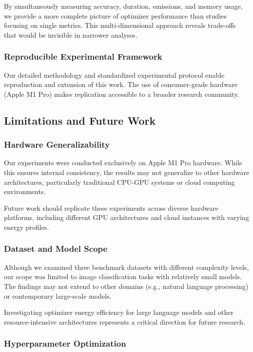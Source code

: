 \documentclass[conference]{IEEEtran}
\begin{document}
By simultaneously measuring accuracy, duration, emissions, and memory usage, we provide a more complete picture of optimizer performance than studies focusing on single metrics. This multi-dimensional approach reveals trade-offs that would be invisible in narrower analyses.

\subsubsection{Reproducible Experimental Framework}

Our detailed methodology and standardized experimental protocol enable reproduction and extension of this work. The use of consumer-grade hardware (Apple M1 Pro) makes replication accessible to a broader research community.

\subsection{Limitations and Future Work}

\subsubsection{Hardware Generalizability}

Our experiments were conducted exclusively on Apple M1 Pro hardware. While this ensures internal consistency, the results may not generalize to other hardware architectures, particularly traditional CPU-GPU systems or cloud computing environments.

Future work should replicate these experiments across diverse hardware platforms, including different GPU architectures and cloud instances with varying energy profiles.

\subsubsection{Dataset and Model Scope}

Although we examined three benchmark datasets with different complexity levels, our scope was limited to image classification tasks with relatively small models. The findings may not extend to other domains (e.g., natural language processing) or contemporary large-scale models.

Investigating optimizer energy efficiency for large language models and other resource-intensive architectures represents a critical direction for future research.

\subsubsection{Hyperparameter Optimization}
\end{document}
